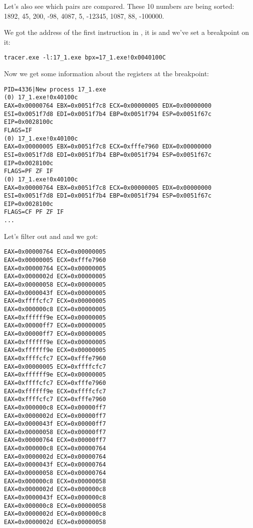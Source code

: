 Let's also see which pairs are compared.
These 10 numbers are being sorted: 
1892, 45, 200, -98, 4087, 5, -12345, 1087, 88, -100000.

We got the address of the first \CMP instruction in \comp, it is  and we've set a breakpoint on it:

\begin{lstlisting}
tracer.exe -l:17_1.exe bpx=17_1.exe!0x0040100C
\end{lstlisting}

Now we get some information about the registers at the breakpoint:

\begin{lstlisting}
PID=4336|New process 17_1.exe
(0) 17_1.exe!0x40100c
EAX=0x00000764 EBX=0x0051f7c8 ECX=0x00000005 EDX=0x00000000
ESI=0x0051f7d8 EDI=0x0051f7b4 EBP=0x0051f794 ESP=0x0051f67c
EIP=0x0028100c
FLAGS=IF
(0) 17_1.exe!0x40100c
EAX=0x00000005 EBX=0x0051f7c8 ECX=0xfffe7960 EDX=0x00000000
ESI=0x0051f7d8 EDI=0x0051f7b4 EBP=0x0051f794 ESP=0x0051f67c
EIP=0x0028100c
FLAGS=PF ZF IF
(0) 17_1.exe!0x40100c
EAX=0x00000764 EBX=0x0051f7c8 ECX=0x00000005 EDX=0x00000000
ESI=0x0051f7d8 EDI=0x0051f7b4 EBP=0x0051f794 ESP=0x0051f67c
EIP=0x0028100c
FLAGS=CF PF ZF IF
...
\end{lstlisting}

Let's filter out  and  and we got:

\begin{lstlisting}
EAX=0x00000764 ECX=0x00000005
EAX=0x00000005 ECX=0xfffe7960
EAX=0x00000764 ECX=0x00000005
EAX=0x0000002d ECX=0x00000005
EAX=0x00000058 ECX=0x00000005
EAX=0x0000043f ECX=0x00000005
EAX=0xffffcfc7 ECX=0x00000005
EAX=0x000000c8 ECX=0x00000005
EAX=0xffffff9e ECX=0x00000005
EAX=0x00000ff7 ECX=0x00000005
EAX=0x00000ff7 ECX=0x00000005
EAX=0xffffff9e ECX=0x00000005
EAX=0xffffff9e ECX=0x00000005
EAX=0xffffcfc7 ECX=0xfffe7960
EAX=0x00000005 ECX=0xffffcfc7
EAX=0xffffff9e ECX=0x00000005
EAX=0xffffcfc7 ECX=0xfffe7960
EAX=0xffffff9e ECX=0xffffcfc7
EAX=0xffffcfc7 ECX=0xfffe7960
EAX=0x000000c8 ECX=0x00000ff7
EAX=0x0000002d ECX=0x00000ff7
EAX=0x0000043f ECX=0x00000ff7
EAX=0x00000058 ECX=0x00000ff7
EAX=0x00000764 ECX=0x00000ff7
EAX=0x000000c8 ECX=0x00000764
EAX=0x0000002d ECX=0x00000764
EAX=0x0000043f ECX=0x00000764
EAX=0x00000058 ECX=0x00000764
EAX=0x000000c8 ECX=0x00000058
EAX=0x0000002d ECX=0x000000c8
EAX=0x0000043f ECX=0x000000c8
EAX=0x000000c8 ECX=0x00000058
EAX=0x0000002d ECX=0x000000c8
EAX=0x0000002d ECX=0x00000058
\end{lstlisting}

